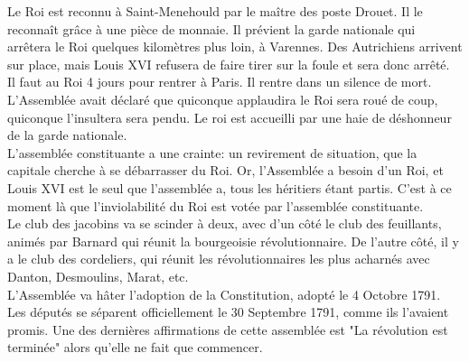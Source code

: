 \documentclass[10pt, a4paper, openany]{book}
\begin{document}
Le Roi est reconnu à Saint-Menehould par le maître des poste Drouet. Il le reconnaît grâce à une pièce de monnaie. Il prévient la garde nationale qui arrêtera le Roi quelques kilomètres plus loin, à Varennes. Des Autrichiens arrivent sur place, mais Louis XVI refusera de faire tirer sur la foule et sera donc arrêté. \\
Il faut au Roi 4 jours pour rentrer à Paris. Il rentre dans un silence de mort. L'Assemblée avait déclaré que quiconque applaudira le Roi sera roué de coup, quiconque l'insultera sera pendu. Le roi est accueilli par une haie de déshonneur de la garde nationale. \\
L'assemblée constituante a une crainte: un revirement de situation, que la capitale cherche à se débarrasser du Roi. Or, l'Assemblée a besoin d'un Roi, et Louis XVI est le seul que l'assemblée a, tous les héritiers étant partis. C'est à ce moment là que l'inviolabilité du Roi est votée par l'assemblée constituante. \\
Le club des jacobins va se scinder à deux, avec d'un côté le club des feuillants, animés par Barnard qui réunit la bourgeoisie révolutionnaire. De l'autre côté, il y a le club des cordeliers, qui réunit les révolutionnaires les plus acharnés avec Danton, Desmoulins, Marat, etc. \\
L'Assemblée va hâter l'adoption de la Constitution, adopté le 4 Octobre 1791. Les députés se séparent officiellement le 30 Septembre 1791, comme ils l'avaient promis. Une des dernières affirmations de cette assemblée est "La révolution est terminée" alors qu'elle ne fait que commencer. 
\end{document}
